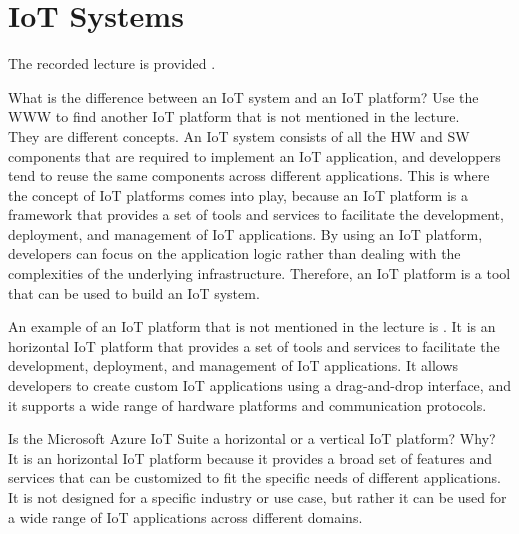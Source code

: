\section{IoT Systems}

The recorded lecture is provided .

\begin{ejercicio}
    What is the difference between an IoT system and an IoT platform? Use the WWW to find another IoT platform that is not mentioned in the lecture.\\

    They are different concepts. An IoT system consists of all the HW and SW components that are required to implement an IoT application, and developpers tend to reuse the same components across different applications. This is where the concept of IoT platforms comes into play, because an IoT platform is a framework that provides a set of tools and services to facilitate the development, deployment, and management of IoT applications. By using an IoT platform, developers can focus on the application logic rather than dealing with the complexities of the underlying infrastructure. Therefore, an IoT platform is a tool that can be used to build an IoT system.

    An example of an IoT platform that is not mentioned in the lecture is . It is an horizontal IoT platform that provides a set of tools and services to facilitate the development, deployment, and management of IoT applications. It allows developers to create custom IoT applications using a drag-and-drop interface, and it supports a wide range of hardware platforms and communication protocols.
\end{ejercicio}

\begin{ejercicio}
    Is the Microsoft Azure IoT Suite a horizontal or a vertical IoT platform? Why?\\

    It is an horizontal IoT platform because it provides a broad set of features and services that can be customized to fit the specific needs of different applications. It is not designed for a specific industry or use case, but rather it can be used for a wide range of IoT applications across different domains.
\end{ejercicio}

